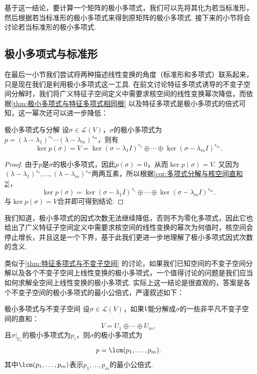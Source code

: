 基于这一结论，要计算一个矩阵的极小多项式，我们可以先将其化为若当标准形，然后根据若当标准形的极小多项式来得到原矩阵的极小多项式. 接下来的小节将会讨论若当标准形的极小多项式.

\subsection{极小多项式与标准形}

在最后一小节我们尝试将两种描述线性变换的角度（标准形和多项式）联系起来，只是现在我们是利用极小多项式这一工具. 在前文讨论特征多项式诱导的不变子空间分解时，我们将广义特征子空间定义中需要求核空间的线性变换幂次降低，而依据\autoref{thm:极小多项式与特征多项式相同根} 以及特征多项式是极小多项式的倍式可知，这一幂次还可以进一步降低：
\begin{theorem}{}{极小多项式与分解}
    设$\sigma\in \mathcal{L}(V)$，$\sigma$的极小多项式为$p=(\lambda-\lambda_1)^{s_1}\cdots(\lambda-\lambda_m)^{s_m}$，则有
    \[\ker p(\sigma)=V=\ker (\sigma-\lambda_1I)^{s_1}\oplus\cdots\oplus\ker (\sigma-\lambda_mI)^{s_m}.\]
\end{theorem}
\begin{proof}
    由于$p$是$\sigma$的极小多项式，因此$p(\sigma)=0$，从而$\ker p(\sigma)=V$. 又因为$(\lambda-\lambda_1)^{s_1},\ldots,(\lambda-\lambda_m)^{s_m}$两两互素，所以根据\autoref{cor:多项式分解与核空间直和2}，
    \[
        \ker p(\sigma)=\ker (\sigma-\lambda_1I)^{s_1}\oplus\cdots\oplus\ker (\sigma-\lambda_mI)^{s_m}.
    \]
    与$\ker p(\sigma)=V$合并即可得到结论.
\end{proof}

我们知道，极小多项式的因式次数无法继续降低，否则不为零化多项式，因此它也给出了广义特征子空间定义中需要求核空间的线性变换的幂次为何值时，核空间会停止增长，并且这是一个下界，基于此我们更进一步地理解了极小多项式因式次数的含义.

类似于\autoref{thm:特征多项式与不变子空间} 的讨论，如果我们已知空间的不变子空间分解以及各个不变子空间上线性变换的极小多项式，一个值得讨论的问题是我们应当如何求解全空间上线性变换的极小多项式. 实际上这一结论是很直观的，答案是各个不变子空间的极小多项式的最小公倍式，严谨叙述如下：
\begin{theorem}{}{极小多项式与不变子空间}
    设$\sigma\in\mathcal{L}(V)$，如果$V$能分解成$\sigma$的一些非平凡不变子空间的直和：
    \[V=U_1\oplus\cdots\oplus U_m,\]
    且$\sigma\vert_{U_i}$的极小多项式为$p_i$，则$\sigma$的极小多项式为
    \[p=\lcm(p_1,\ldots,p_m).\]
    其中$\lcm(p_1,\ldots,p_m)$表示$p_1,\ldots,p_m$的最小公倍式.
\end{theorem}

